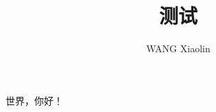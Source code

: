 \documentclass{wx672article} %
\title{测试}
\author{WANG Xiaolin}
\begin{document}
\maketitle{}

世界，你好！
\end{document}
